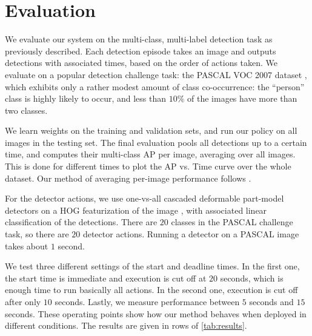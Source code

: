 \section{Evaluation} \label{sec:evaluation}

We evaluate our system on the multi-class, multi-label detection task as previously described.
Each detection episode takes an image and outputs detections with associated times, based on the order of actions taken.
We evaluate on a popular detection challenge task: the PASCAL VOC 2007 dataset \cite{pascal-voc-2010}, which exhibits only a rather modest amount of class co-occurrence: the ``person'' class is highly likely to occur, and less than $10\%$ of the images have more than two classes.

We learn weights on the training and validation sets, and run our policy on all images in the testing set.
The final evaluation pools all detections up to a certain time, and computes their multi-class AP per image, averaging over all images.
This is done for different times to plot the AP vs. Time curve over the whole dataset.
Our method of averaging per-image performance follows \cite{Desai2009}.

For the detector actions, we use one-vs-all cascaded deformable part-model detectors on a HOG featurization of the image \cite{Felzenszwalb2010b}, with associated linear classification of the detections.
There are $20$ classes in the PASCAL challenge task, so there are $20$ detector actions.
Running a detector on a PASCAL image takes about $1$ second.

We test three different settings of the start and deadline times.
In the first one, the start time is immediate and execution is cut off at $20$ seconds, which is enough time to run basically all actions.
In the second one, execution is cut off after only $10$ seconds.
Lastly, we measure performance between $5$ seconds and $15$ seconds.
These operating points show how our method behaves when deployed in different conditions.
The results are given in rows of \autoref{tab:results}.

